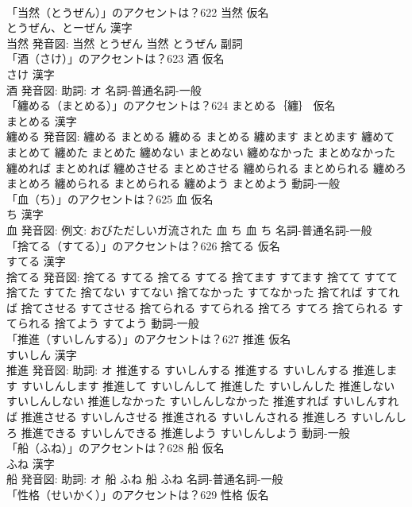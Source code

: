 \documentclass[8pt]{extreport}
\begin{document}
\begin{CJK}{UTF8}{min}
\\	「当然（とうぜん）」のアクセントは？622	当然 仮名　
\\	とうぜん、とーぜん 漢字　
\\	当然 発音図:	当然 とうぜん		当然 とうぜん				副詞 
\\	「酒（さけ）」のアクセントは？623	酒 仮名　
\\	さけ 漢字　
\\	酒 発音図: 助詞: オ							名詞-普通名詞-一般 
\\	「纏める（まとめる）」のアクセントは？624	まとめる｛纏｝ 仮名　
\\	まとめる 漢字　
\\	纏める 発音図:	纏める まとめる		纏める まとめる 纏めます まとめます 纏めて まとめて 纏めた まとめた 纏めない まとめない 纏めなかった まとめなかった 纏めれば まとめれば 纏めさせる まとめさせる 纏められる まとめられる 纏めろ まとめろ 纏められる まとめられる 纏めよう まとめよう				動詞-一般 
\\	「血（ち）」のアクセントは？625	血 仮名　
\\	ち 漢字　
\\	血 発音図: 例文: おびただしいガ流された	血 ち		血 ち				名詞-普通名詞-一般 
\\	「捨てる（すてる）」のアクセントは？626	捨てる 仮名　
\\	すてる 漢字　
\\	捨てる 発音図:	捨てる すてる		捨てる すてる 捨てます すてます 捨てて すてて 捨てた すてた 捨てない すてない 捨てなかった すてなかった 捨てれば すてれば 捨てさせる すてさせる 捨てられる すてられる 捨てろ すてろ 捨てられる すてられる 捨てよう すてよう				動詞-一般 
\\	「推進（すいしんする）」のアクセントは？627	推進 仮名　
\\	すいしん 漢字　
\\	推進 発音図: 助詞: オ	推進する すいしんする		推進する すいしんする 推進します すいしんします 推進して すいしんして 推進した すいしんした 推進しない すいしんしない 推進しなかった すいしんしなかった 推進すれば すいしんすれば 推進させる すいしんさせる 推進される すいしんされる 推進しろ すいしんしろ 推進できる すいしんできる 推進しよう すいしんしよう				動詞-一般 
\\	「船（ふね）」のアクセントは？628	船 仮名　
\\	ふね 漢字　
\\	船 発音図: 助詞: オ	船 ふね		船 ふね				名詞-普通名詞-一般 
\\	「性格（せいかく）」のアクセントは？629	性格 仮名　

\end{CJK}
\end{document}
